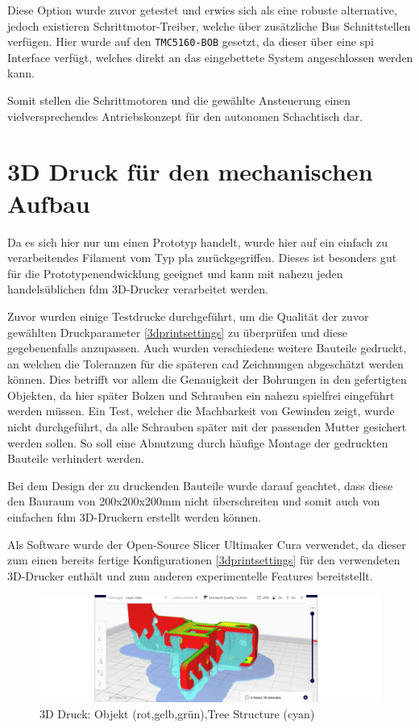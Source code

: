 Diese Option wurde zuvor getestet und erwies sich als eine robuste
alternative, jedoch existieren Schrittmotor-Treiber, welche über
zusätzliche Bus Schnittstellen verfügen. Hier wurde auf den
\passthrough{\lstinline!TMC5160-BOB!} gesetzt, da dieser über eine
\gls{spi} Interface verfügt, welches direkt an das eingebettete System
angeschlossen werden kann.

Somit stellen die Schrittmotoren und die gewählte Ansteuerung einen
vielversprechendes Antriebskonzept für den autonomen Schachtisch dar.

\hypertarget{d-druck-fuxfcr-den-mechanischen-aufbau}{%
\section{3D Druck für den mechanischen
Aufbau}\label{d-druck-fuxfcr-den-mechanischen-aufbau}}

Da es sich hier nur um einen Prototyp handelt, wurde hier auf ein
einfach zu verarbeitendes Filament vom Typ \gls{pla} zurückgegriffen.
Dieses ist besonders gut für die Prototypenendwicklung geeignet und kann
mit nahezu jeden handelsüblichen \gls{fdm} 3D-Drucker verarbeitet
werden.

Zuvor wurden einige Testdrucke durchgeführt, um die Qualität der zuvor
gewählten Druckparameter \ref{3dprintsettings} zu überprüfen und diese
gegebenenfalls anzupassen. Auch wurden verschiedene weitere Bauteile
gedruckt, an welchen die Toleranzen für die späteren \gls{cad}
Zeichnungen abgeschätzt werden können. Dies betrifft vor allem die
Genauigkeit der Bohrungen in den gefertigten Objekten, da hier später
Bolzen und Schrauben ein nahezu spielfrei eingeführt werden müssen. Ein
Test, welcher die Machbarkeit von Gewinden zeigt, wurde nicht
durchgeführt, da alle Schrauben später mit der passenden Mutter
gesichert werden sollen. So soll eine Abnutzung durch häufige Montage
der gedruckten Bauteile verhindert werden.

Bei dem Design der zu druckenden Bauteile wurde darauf geachtet, dass
diese den Bauraum von 200x200x200mm nicht überschreiten und somit auch
von einfachen \gls{fdm} 3D-Druckern erstellt werden können.

Als Software wurde der Open-Source Slicer Ultimaker Cura
\cite{ultimakercura} verwendet, da dieser zum einen bereits fertige
Konfigurationen \ref{3dprintsettings} für den verwendeten 3D-Drucker
enthält und zum anderen experimentelle Features bereitstellt.

\begin{figure}
\centering
\includegraphics{images/3d_print_tree_structure.png}
\caption{3D Druck: Objekt (rot,gelb,grün),Tree Structure (cyan)
\label{3d_print_tree_structure}}
\end{figure}

